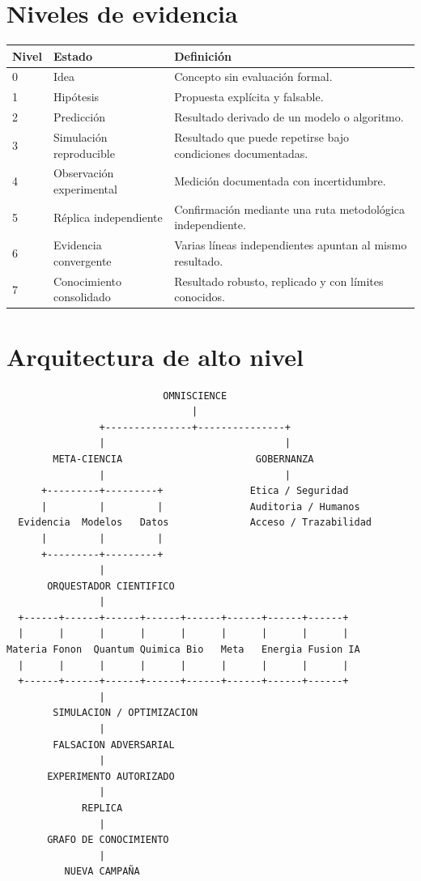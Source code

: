 \documentclass[11pt,a4paper]{article}
\begin{document}
\section{Niveles de evidencia}
\begin{longtable}{p{1.2cm}p{4cm}p{9cm}}
\toprule Nivel & Estado & Definición\\\midrule
0 & Idea & Concepto sin evaluación formal.\\
1 & Hipótesis & Propuesta explícita y falsable.\\
2 & Predicción & Resultado derivado de un modelo o algoritmo.\\
3 & Simulación reproducible & Resultado que puede repetirse bajo condiciones documentadas.\\
4 & Observación experimental & Medición documentada con incertidumbre.\\
5 & Réplica independiente & Confirmación mediante una ruta metodológica independiente.\\
6 & Evidencia convergente & Varias líneas independientes apuntan al mismo resultado.\\
7 & Conocimiento consolidado & Resultado robusto, replicado y con límites conocidos.\\\bottomrule
\end{longtable}

\section{Arquitectura de alto nivel}
\begin{verbatim}
                           OMNISCIENCE
                                |
                +---------------+---------------+
                |                               |
        META-CIENCIA                       GOBERNANZA
                |                               |
      +---------+---------+               Etica / Seguridad
      |         |         |               Auditoria / Humanos
  Evidencia  Modelos   Datos              Acceso / Trazabilidad
      |         |         |
      +---------+---------+
                |
       ORQUESTADOR CIENTIFICO
                |
  +------+------+------+------+------+------+------+------+
  |      |      |      |      |      |      |      |      |
Materia Fonon  Quantum Quimica Bio   Meta   Energia Fusion IA
  |      |      |      |      |      |      |      |      |
  +------+------+------+------+------+------+------+------+ 
                |
        SIMULACION / OPTIMIZACION
                |
        FALSACION ADVERSARIAL
                |
       EXPERIMENTO AUTORIZADO
                |
             REPLICA
                |
       GRAFO DE CONOCIMIENTO
                |
          NUEVA CAMPAÑA
\end{verbatim}
\end{document}
